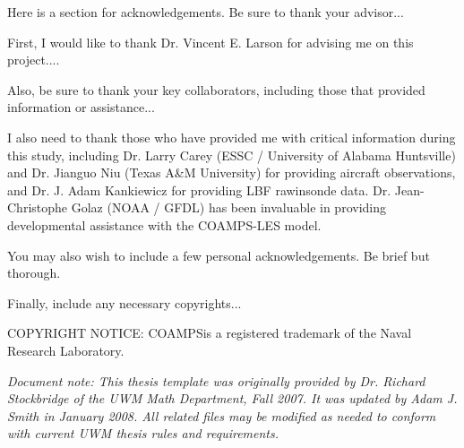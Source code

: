 \documentclass[master]{UWMThesis}
\begin{document}

\begin{ThesisAcknowledgement}
Here is a section for acknowledgements.  Be sure to thank your advisor...

First, I would like to thank Dr. Vincent E. Larson for advising me on this project....

Also, be sure to thank your key collaborators, including those that provided information or assistance...

I also need to thank those who have provided me with critical information during this study, including Dr. Larry Carey (ESSC / University of Alabama Huntsville) and Dr. Jianguo Niu (Texas A\&M University) for providing aircraft observations, and Dr. J. Adam Kankiewicz for providing LBF rawinsonde data.  Dr. Jean-Christophe Golaz (NOAA / GFDL) has been invaluable in providing developmental assistance with the COAMPS-LES model.

You may also wish to include a few personal acknowledgements.  Be brief but thorough.

Finally, include any necessary copyrights...

COPYRIGHT NOTICE: COAMPS\textregistered is a registered trademark of the Naval Research Laboratory.

{\textit{
Document note: This thesis template was originally provided by Dr. Richard Stockbridge of the UWM Math Department, Fall 2007.  It was updated by Adam J. Smith in January 2008.  All related files may be modified as needed to conform with current UWM thesis rules and requirements.
}}
\end{ThesisAcknowledgement}




\ThesisMainmatter
\end{document}
